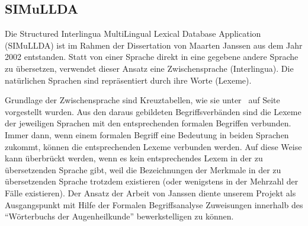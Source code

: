 \documentclass[pagesize,paper=A4,DIV=calc,fontsize=12pt,draft=false]{scrreprt}
\begin{document}
\subsection{SIMuLLDA}

Die Structured Interlingua MultiLingual Lexical Database Application (SIMuLLDA) ist im Rahmen der Dissertation von Maarten Janssen aus dem Jahr 2002 entstanden. 
Statt von einer Sprache direkt in eine gegebene andere Sprache zu übersetzen, verwendet dieser Ansatz eine Zwischensprache (Interlingua). 
Die natürlichen Sprachen sind repräsentiert durch ihre Worte (Lexeme). 

Grundlage der Zwischensprache sind Kreuztabellen, wie sie unter\emph{~} auf Seite~\pageref{subsec:fba} vorgestellt wurden. 
Aus den daraus gebildeten Begriffsverbänden sind die Lexeme der jeweiligen Sprachen mit den entsprechenden formalen Begriffen verbunden. 
Immer dann, wenn einem formalen Begriff eine Bedeutung in beiden Sprachen zukommt, können die entsprechenden Lexeme verbunden werden. 
Auf diese Weise kann überbrückt werden, wenn es kein entsprechendes Lexem in der zu übersetzenden Sprache gibt, weil die Bezeichnungen der Merkmale in der zu übersetzenden Sprache trotzdem existieren (oder wenigstens in der Mehrzahl der Fälle existieren). 
Der Ansatz der Arbeit von Janssen diente unserem Projekt als Ausgangspunkt mit Hilfe der Formalen Begriffsanalyse Zuweisungen innerhalb des \enquote{Wörterbuchs der Augenheilkunde} bewerkstelligen zu können. 
\end{document}
